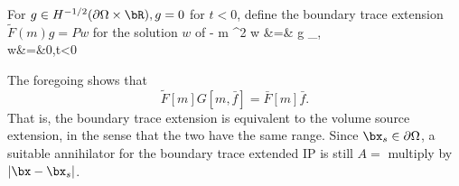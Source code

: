 For $g \in H^{-1/2}(\partial \Omega \times \bR), g=0$ for $t<0$,
define the boundary trace extension $\tilde{F}(m)g = Pw$ for the
solution $w$ of 
\bea
\label{awe3}
  - m \nabla^2 w &=& g
 \delta_{\partial \Omega \times \bR},\\
w&=&0,t<0
\eea

The foregoing shows that
\[
\tilde{F}[m]G[m,\bar{f}] = \bar{F}[m]\bar{f}.
\]
That is, the boundary trace extension is equivalent to the volume
source extension, in the sense that the two have the same
range. Since $\bx_s \in \partial \Omega$, a suitable annihilator for
the boundary trace extended IP is still $A =$ multiply by $|\bx-\bx_s|$.